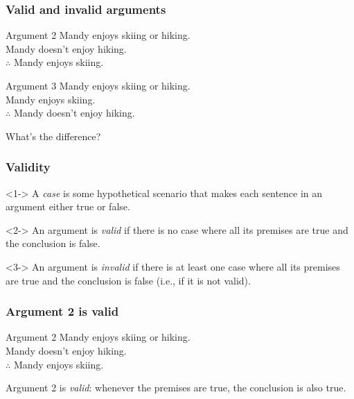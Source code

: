 \begin{frame}
  \frametitle{Valid and invalid arguments}

  \begin{block}{Argument 2}
  Mandy enjoys skiing or hiking.\\
  Mandy doesn't enjoy hiking.\\
  $\therefore$ Mandy enjoys skiing.
  \end{block}

  \begin{block}{Argument 3}
  Mandy enjoys skiing or hiking.\\
  Mandy enjoys skiing.\\
  $\therefore$ Mandy doesn't enjoy hiking.
  \end{block}

  What's the difference?

\end{frame}


\begin{frame}
  \frametitle{Validity}

  \begin{definition}<1->
  A \emph{case} is some hypothetical scenario that makes each sentence
  in an argument either true or false.
  \end{definition}

  \begin{definition}<2->
  An argument is \emph{valid} if there is no case where all its
  premises are true and the conclusion is false.
  \end{definition}

  \begin{definition}<3->
  An argument is \emph{invalid} if there is at least one case where
  all its premises are true and the conclusion is false (i.e., if it
  is not valid).
  \end{definition}
\end{frame}

\begin{frame}
  \frametitle{Argument 2 is valid}

  \begin{block}{Argument 2}
  Mandy enjoys skiing or hiking.\\
  Mandy doesn't enjoy hiking.\\
  $\therefore$ Mandy enjoys skiing.
  \end{block}

Argument 2 is \emph{valid}: whenever the premises are
true, the conclusion is also true.

\end{frame}

